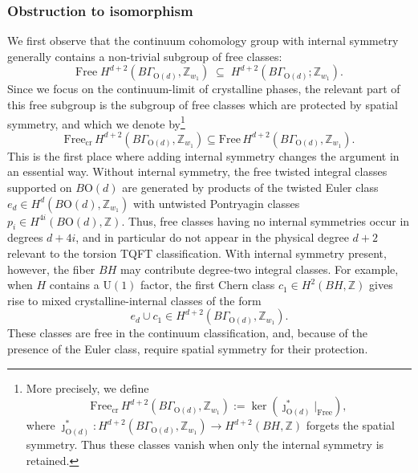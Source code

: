 \documentclass[aps,prx,reprint,superscriptaddress,twocolumn,amsmath,amssymb,amsfonts, nofootinbib]{revtex4-2}
\newcommand{\U}{\text{U}}
\newcommand{\Z}{\mathbb{Z}}
\theoremstyle{apsstyle}
\begin{document}
{\subsubsection{Obstruction to isomorphism}
\label{sec:obs_to_isom}
We first observe that the continuum cohomology group with internal symmetry generally contains a non-trivial subgroup of free classes:
\begin{equation*}
    \mathrm{Free}\; H^{d+2}(B\Gamma_{\mathrm{O}(d)}, \Z_{w_{1}})\;\subseteq \; H^{d+2}(B\Gamma_{\mathrm{O}(d)};\mathbb Z_{w_1}).
\end{equation*}
Since we focus on the continuum-limit of crystalline phases, the relevant part of this free subgroup is the subgroup of free classes which are protected by spatial symmetry, and which we denote by\footnote{More precisely, we define
\begin{equation*}
\mathrm{Free}_{\mathrm{cr}}\,
H^{d+2}(B\Gamma_{\mathrm{O}(d)},\mathbb Z_{w_1})
:=
\ker\!\left(
\jmath_{\mathrm{O}(d)}^{*}\big|_{\mathrm{Free}}
\right),
\end{equation*}
where
$\jmath_{\mathrm{O}(d)}^{*}:H^{d+2}(B\Gamma_{\mathrm{O}(d)},\mathbb Z_{w_1})
\to H^{d+2}(BH,\mathbb Z)$
forgets the spatial symmetry. Thus these classes vanish when only the
internal symmetry is retained.} 
\begin{equation*}
\mathrm{Free}_{\mathrm{cr}}\, H^{d+2}(B\Gamma_{\mathrm{O}(d)},\Z_{w_1}) \subseteq
\mathrm{Free}\, H^{d+2}(B\Gamma_{\mathrm{O}(d)},\Z_{w_1}).
\end{equation*}
This is the first place where adding internal symmetry changes the argument in an essential way. Without internal symmetry, the free twisted integral classes supported on $B\mathrm{O}(d)$ are generated by products of the twisted Euler class $e_d\in H^d(B\mathrm{O}(d),\Z_{w_1})$ with untwisted Pontryagin classes $p_i\in H^{4i}(B\mathrm{O}(d),\Z)$. Thus, free classes having no internal symmetries occur in degrees $d+4i$, and in particular do not appear in the physical degree $d+2$ relevant to the torsion TQFT classification. With internal symmetry present, however, the fiber $BH$ may contribute degree-two integral classes. For example, when $H$ contains a $\U(1)$ factor, the first Chern class $c_1\in H^2(BH,\Z)$ gives rise to mixed crystalline-internal classes of the form
\begin{equation*}
e_d\cup c_1 \in H^{d+2}(B\Gamma_{\mathrm{O}(d)},\Z_{w_1}).
\end{equation*}
These classes are free in the continuum classification, and, because of the presence of the Euler class, require spatial symmetry for their protection.

}
\end{document}
